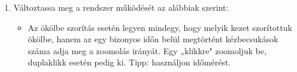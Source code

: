 \begin{enumerate}
	\item Változtassa meg a rendszer működését az alábbiak szerint:
	\begin{itemize}
		\item Az ökölbe szorítás esetén legyen mindegy, hogy melyik kezet szorítottuk ökölbe, hanem az egy bizonyos időn belül megtörtént kézbecsukások száma adja meg a zoomolás irányát. Egy „klikkre" zoomoljuk be, duplaklikk esetén pedig ki. Tipp: használjon időmérést.
	\end{itemize}
\end{enumerate}
